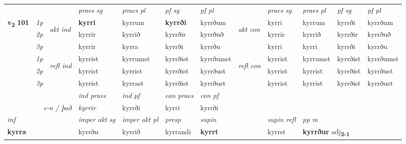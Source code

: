 \begin{longtable}[l]{X>{\footnotesize\itshape}llXXXXlXXXX}
 & &   & \textit{praes sg}  & \textit{praes pl}    & \textit{ pf sg} & \textit{pf pl} & & \textit{praes sg}  & \textit{praes pl}    & \textit{pf sg} & \textit{pf pl }  \\ \cmidrule{4-7} \cmidrule{9-12}
 \multirow{2}{*}{{{\textbf{v{\textsubscript{2}}} \Large{\textbf{101}}}}}  & 1p & \multirow{3}{*}{\begin{turn}{90}\textit{akt ind}\end{turn}} & \textbf{kyrri} & kyrrum & \textbf{kyrrði} & kyrrðum & \multirow{3}{*}{\begin{turn}{90}\textit{akt con}\end{turn}} &kyrri & kyrrum & kyrrði & kyrrðum\\*
 & 2p &  &  kyrrir  & kyrrið & kyrrðir & kyrrðuð & & kyrrir & kyrrið & kyrrðir & kyrrðuð \\*
 & 3p &  & kyrrir & kyrra & kyrrði & kyrrðu & & kyrri & kyrri& kyrrði & kyrrðu \\*
\cmidrule{4-7} \cmidrule{9-12}
 & 1p & \multirow{3}{*}{\begin{turn}{90}\textit{refl ind}\end{turn}}  & kyrrist & kyrrumst & kyrrðist & kyrrðumst & \multirow{3}{*}{\begin{turn}{90}\textit{refl con}\end{turn}}  &kyrrist & kyrrumst & kyrrðist & kyrrðumst \\*
 & 2p &  & kyrrist & kyrrist & kyrrðist & kyrrðust & &kyrrist & kyrrist & kyrrðist & kyrrðust \\*
 & 3p  & & kyrrist & kyrrast & kyrrðist & kyrrðust & & kyrrist & kyrrist& kyrrðist & kyrrðust \\*
\cmidrule{4-7} \cmidrule{9-12}

   && &  \textit{ind praes} & \textit{ind pf} & \textit{con praes} & \textit{con pf} \\*
\multicolumn{3}{r}{\textit{e-n / það}} & kyrrir & kyrrði & kyrri & kyrrði \\*

\cmidrule{4-7}
   {\textit{inf}} & &  & \textit{imper akt sg} & \textit{imper akt pl}   & \textit{presp} & \textit{supin} && \textit{supin refl} & \textit{pp m} \\*
  {\textbf{kyrra}} & && kyrrðu  & kyrrið   & kyrrandi &  \textbf{kyrrt} && kyrrst & \multicolumn{2}{l}{\textbf{kyrrður} adj\textbf{\textsubscript{2-1}}} \\*

\midrule


\end{longtable}
